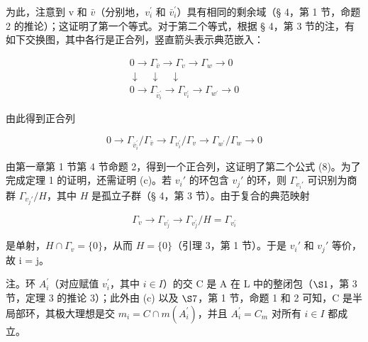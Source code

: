 为此，注意到 v 和 \(\bar{v}\)（分别地，\(v_{i}^{\prime}\) 和 \(\bar{v}_{i}^{\prime}\)）具有相同的剩余域（§ 4，第 1 节，命题 2 的推论）；这证明了第一个等式。对于第二个等式，根据 § 4，第 3 节的注，有如下交换图，其中各行是正合列，竖直箭头表示典范嵌入：

\[
\begin{array}{c} 0 \to \Gamma_ {\bar {v}} \to \Gamma_ {v} \to \Gamma_ {w} \to 0 \\ \downarrow \quad \downarrow \quad \downarrow \\ 0 \to \Gamma_ {\bar {v} _ {i} ^ {\prime}} \to \Gamma_ {v _ {i} ^ {\prime}} \to \Gamma_ {w ^ {\prime}} \to 0 \end{array}
\]

由此得到正合列

\[
0 \rightarrow \Gamma_ {\bar {v} _ {i} ^ {\prime}} / \Gamma_ {\bar {v}} \rightarrow \Gamma_ {v _ {i} ^ {\prime}} / \Gamma_ {v} \rightarrow \Gamma_ {w ^ {\prime}} / \Gamma_ {w} \rightarrow 0
\]

由第一章第 1 节第 4 节命题 2，得到一个正合列，这证明了第二个公式 (8)。为了完成定理 1 的证明，还需证明 (c)。若 \(v_i'\) 的环包含 \(v_j'\) 的环，则 \(\Gamma_{v_i'}\) 可识别为商群 \(\Gamma_{v_j'} / H\)，其中 \(H\) 是孤立子群（§ 4，第 3 节）。由于复合的典范映射

\[
\Gamma_ {v} \rightarrow \Gamma_ {v _ {j} ^ {\prime}} \rightarrow \Gamma_ {v _ {j} ^ {\prime}} / H = \Gamma_ {v _ {i} ^ {\prime}}
\]

是单射，\(H \cap \Gamma_{v} = \{0\}\)，从而 \(H = \{0\}\)（引理 3，第 1 节）。于是 \(v_{i}'\) 和 \(v_{j}'\) 等价，故 i = j。

注。环 \(A_{i}^{\prime}\)（对应赋值 \(v_{i}^{\prime}\)，其中 \(i \in I\)）的交 C 是 A 在 L 中的整闭包（\(\S 1\)，第 3 节，定理 3 的推论 3）；此外由 (c) 以及 \(\S 7\)，第 1 节，命题 1 和 2 可知，C 是半局部环，其极大理想是交 \(m_{i} = C \cap m(A_{i}^{\prime})\)，并且 \(A_{i}^{\prime} = C_{m}\) 对所有 \(i \in I\) 都成立。

